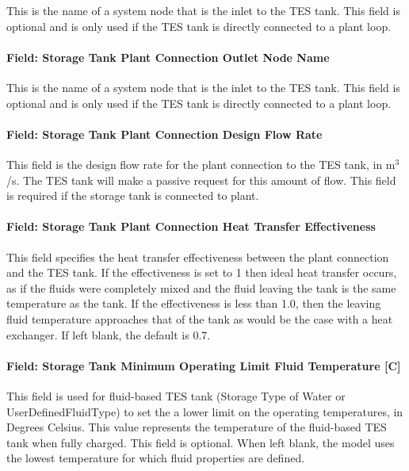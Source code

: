 This is the name of a system node that is the inlet to the TES tank. This field is optional and is only used if the TES tank is directly connected to a plant loop.

\paragraph{Field: Storage Tank Plant Connection Outlet Node Name}\label{field-storage-tank-plant-connection-outlet-node-name}

This is the name of a system node that is the inlet to the TES tank. This field is optional and is only used if the TES tank is directly connected to a plant loop.

\paragraph{Field: Storage Tank Plant Connection Design Flow Rate}\label{field-storage-tank-plant-connection-design-flow-rate}

This field is the design flow rate for the plant connection to the TES tank, in m\(^{3}\)/s. The TES tank will make a passive request for this amount of flow. This field is required if the storage tank is connected to plant.

\paragraph{Field: Storage Tank Plant Connection Heat Transfer Effectiveness}\label{field-storage-tank-plant-connection-heat-transfer-effectiveness}

This field specifies the heat transfer effectiveness between the plant connection and the TES tank. If the effectiveness is set to 1 then ideal heat transfer occurs, as if the fluids were completely mixed and the fluid leaving the tank is the same temperature as the tank. If the effectiveness is less than 1.0, then the leaving fluid temperature approaches that of the tank as would be the case with a heat exchanger. If left blank, the default is 0.7.

\paragraph{Field: Storage Tank Minimum Operating Limit Fluid Temperature {[}C{]}}\label{field-storage-tank-minimum-operating-limit-fluid-temperature-c}

This field is used for fluid-based TES tank (Storage Type of Water or UserDefinedFluidType) to set the a lower limit on the operating temperatures, in Degrees Celsius. This value represents the temperature of the fluid-based TES tank when fully charged. This field is optional. When left blank, the model uses the lowest temperature for which fluid properties are defined.

